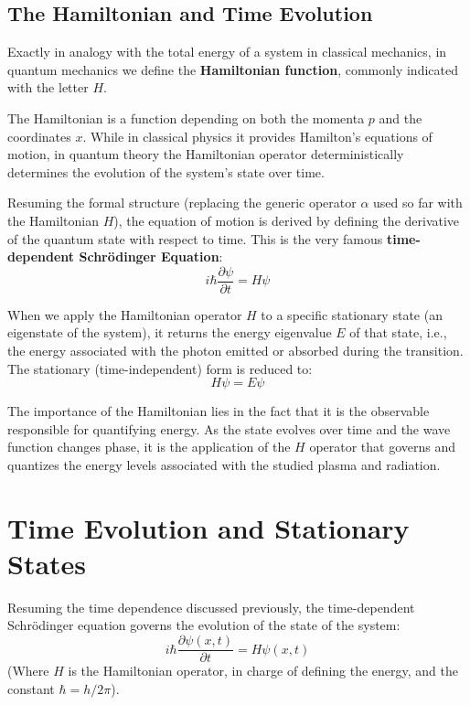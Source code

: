 \subsection{The Hamiltonian and Time Evolution}

Exactly in analogy with the total energy of a system in classical mechanics, in quantum mechanics we define the \textbf{Hamiltonian function}, commonly indicated with the letter $H$.

The Hamiltonian is a function depending on both the momenta $p$ and the coordinates $x$. While in classical physics it provides Hamilton's equations of motion, in quantum theory the Hamiltonian operator deterministically determines the evolution of the system's state over time.

Resuming the formal structure (replacing the generic operator $\alpha$ used so far with the Hamiltonian $H$), the equation of motion is derived by defining the derivative of the quantum state with respect to time. This is the very famous \textbf{time-dependent Schrödinger Equation}:
\begin{equation}
i \hbar \frac{\partial \psi}{\partial t} = H \psi
\end{equation}

When we apply the Hamiltonian operator $H$ to a specific stationary state (an eigenstate of the system), it returns the energy eigenvalue $E$ of that state, i.e., the energy associated with the photon emitted or absorbed during the transition. The stationary (time-independent) form is reduced to:
\begin{equation}
H \psi = E \psi
\end{equation}

The importance of the Hamiltonian lies in the fact that it is the observable responsible for quantifying energy. As the state evolves over time and the wave function changes phase, it is the application of the $H$ operator that governs and quantizes the energy levels associated with the studied plasma and radiation.

\section{Time Evolution and Stationary States}

Resuming the time dependence discussed previously, the time-dependent Schrödinger equation governs the evolution of the state of the system:
\begin{equation}
i \hbar \frac{\partial \psi(x,t)}{\partial t} = H \psi(x,t)
\end{equation}
(Where $H$ is the Hamiltonian operator, in charge of defining the energy, and the constant $\hbar = h / 2\pi$).

